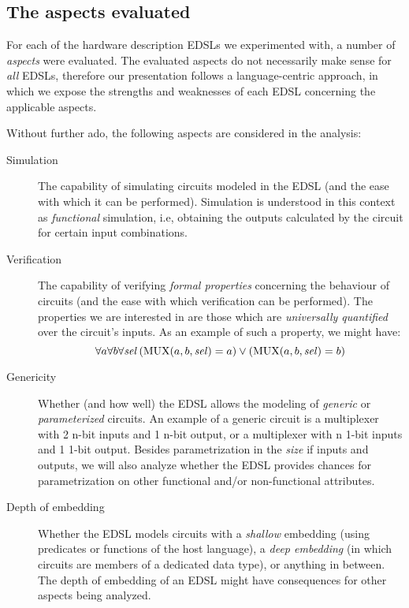     \subsection{The aspects evaluated}
    \label{subsec:aspects}

        For each of the hardware description \acp{EDSL} we experimented with, a number of
        \emph{aspects} were evaluated. The evaluated aspects do not necessarily make sense for
        \emph{all} \acp{EDSL}, therefore our presentation follows a language-centric approach, in
        which we expose the strengths and weaknesses of each \ac{EDSL} concerning the applicable
        aspects.

        Without further ado, the following aspects are considered in the analysis:

        \begin{description}
            \item[Simulation] The capability of simulating circuits modeled in the \ac{EDSL} (and the
            ease with which it can be performed). Simulation is understood in this context as
            \emph{functional} simulation, i.e, obtaining the outputs calculated by the circuit for
            certain input combinations.

            \item[Verification] The capability of verifying \emph{formal properties} concerning the
            behaviour of circuits (and the ease with which verification can be performed). The
            properties we are interested in are those which are \emph{universally quantified} over
            the circuit's inputs. As an example of such a property, we might have: \[ \forall a
            \forall b \forall \text{\textit{sel}} \left( \text{MUX}(a,b,\text{\textit{sel}}) = a
            \right) \vee \left( \text{MUX}(a,b,\text{\textit{sel}}) = b \right) \]

            \item[Genericity] Whether (and how well) the \ac{EDSL} allows the modeling of \emph{generic}
            or \emph{parameterized} circuits. An example of a generic circuit is a multiplexer with
            2 n-bit inputs and 1 n-bit output, or a multiplexer with n 1-bit inputs and 1 1-bit
            output. Besides parametrization in the \emph{size} if inputs and outputs, we will also
            analyze whether the \ac{EDSL} provides chances for parametrization on other functional and/or
            non-functional attributes.

            \item[Depth of embedding] Whether the \ac{EDSL} models circuits with a \emph{shallow}
            embedding (using predicates or functions of the host language), a \emph{deep embedding}
            (in which circuits are members of a dedicated data type), or anything in between. The
            depth of embedding of an \ac{EDSL} might have consequences for other aspects being analyzed.


\end{description}
